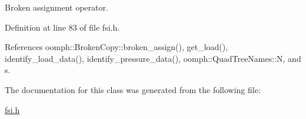 Broken assignment operator. 



Definition at line 83 of file fsi.\+h.



References oomph\+::\+Broken\+Copy\+::broken\+\_\+assign(), get\+\_\+load(), identify\+\_\+load\+\_\+data(), identify\+\_\+pressure\+\_\+data(), oomph\+::\+Quad\+Tree\+Names\+::N, and s.



The documentation for this class was generated from the following file\+:\begin{DoxyCompactItemize}
\item 
\hyperlink{fsi_8h}{fsi.\+h}\end{DoxyCompactItemize}
